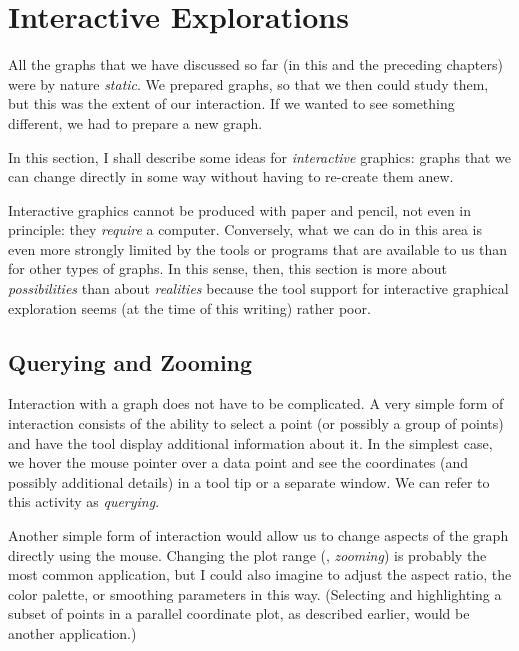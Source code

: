 \vspace*{-6pt}
\section{Interactive Explorations}


All the graphs that we have discussed so far (in this and the
preceding chapters) were by nature \emph{static}. We prepared graphs,
so that we then could study them, but this was the extent of our
interaction.  If we wanted to see something different, we had to
prepare a new graph.

In this section, I shall describe some ideas for \emph{interactive}
graphics: graphs that we can change directly in some way without
having to re-create them anew.

Interactive graphics cannot be produced with paper and pencil, not
even in principle: they \emph{require} a computer. Conversely, what we
can do in this area is even more strongly limited by the tools or
programs that are available to us than for other types of graphs. In
this sense, then, this section is more about \emph{possibilities} than
about \emph{realities} because the tool support for interactive
graphical exploration seems (at the time of this writing) rather poor.

\subsection{Querying and Zooming}


Interaction with a graph does not have to be complicated. A very
simple form of interaction consists of the ability to select a point
(or possibly a group of points) and have the tool display additional
information about it. In the simplest case, we hover the mouse pointer
over a data point and see the coordinates (and possibly additional
details) in a tool tip or a separate window. We can refer to this
activity as \emph{querying}.

Another simple form of interaction would allow us to change aspects of
the graph directly using the mouse.  Changing the plot range (\ie,
\emph{zooming}) is probably the most common application, but I could
also imagine to adjust the aspect ratio, the color palette, or
smoothing parameters in this way. (Selecting and highlighting a subset
of points in a parallel coordinate plot, as described earlier, would
be another application.)

